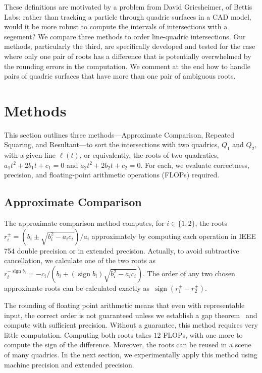 \documentclass{cccg16}
\DeclareMathOperator{\sign}{sign}
\begin{document}
These definitions are motivated by a problem from David Griesheimer,
of Bettis Labs: rather than tracking a particle through quadric
surfaces in a CAD model, would it be more robust to compute the
intervals of intersections with a segement?  We compare three methods
to order line-quadric intersections.  Our methods, particularly the
third, are specifically developed and tested for the case where only
one pair of roots has a difference that is potentially overwhelmed by
the rounding errors in the computation. We comment at the end how to
handle pairs of quadric surfaces that have more than one pair of
ambiguous roots.

\section{Methods}
This section outlines three methods---Approximate Comparison,
Repeated Squaring, and Resultant---to sort the intersections with two
quadrics, $Q_1$ and $Q_2$, with a given line $\ell(t)$, or
equivalently, the roots of two quadratics, $a_1t^2+2b_1t+c_1=0$ and
$a_2t^2+2b_2t+c_2=0$.  For each, we evaluate correctness, precision,
and floating-point arithmetic operations (FLOPs) required.

\subsection{Approximate Comparison}
The approximate comparison method computes, for $i\in\{1, 2\}$, the
roots~$r_i^\pm=({b_i\pm\sqrt{b_i^2-a_ic_i}})/{a_i}$ approximately by
computing each operation in IEEE 754 double precision or in extended precision.  
Actually, to avoid subtractive cancellation, we calculate one of the two roots as 
$r_i^{-\sign b_i}=-c_i/({b_i+(\sign{b_i})\sqrt{b_i^2-a_ic_i}})$.
The order of any two chosen approximate roots can be
calculated exactly as~$\sign(r_1^\pm-r_2^\pm)$.

The rounding of floating point arithmetic means that even with representable input, the correct order 
is not guaranteed unless we establish a gap theorem~\cite{Canny,EMT} and compute with sufficient precision.   
Without a guarantee,  this method
requires very little computation.  Computing both roots takes
$12$ FLOPs, with one more to compute the sign of the difference.   
Moreover, the roots can be reused in a scene of many quadrics.  
In the next section, we experimentally apply this method using machine precision and extended precision.
\end{document}
